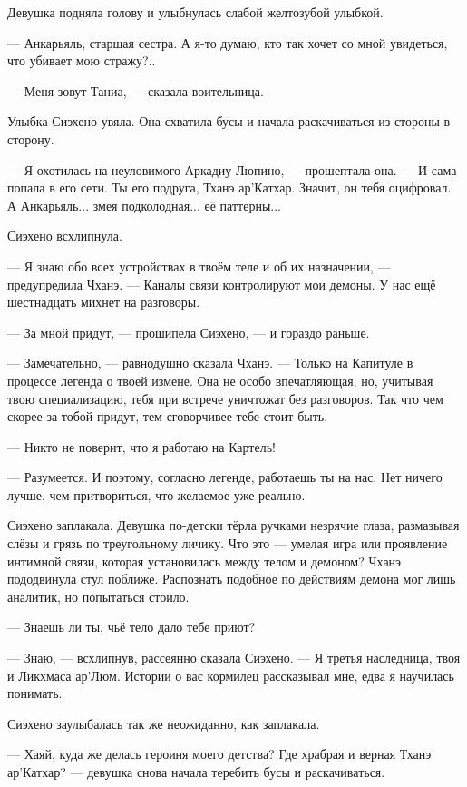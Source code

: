 Девушка подняла голову и улыбнулась слабой желтозубой улыбкой.

--- Анкарьяль, старшая сестра.
А я-то думаю, кто так хочет со мной увидеться, что убивает мою стражу?..

--- Меня зовут Таниа, --- сказала воительница.

Улыбка Сиэхено увяла.
Она схватила бусы и начала раскачиваться из стороны в сторону.

--- Я охотилась на неуловимого Аркадиу Люпино, --- прошептала она.
--- И сама попала в его сети.
Ты его подруга, Тханэ ар'Катхар.
Значит, он тебя оцифровал.
А Анкарьяль... змея подколодная... её паттерны...

Сиэхено всхлипнула.

--- Я знаю обо всех устройствах в твоём теле и об их назначении, --- предупредила Чханэ.
--- Каналы связи контролируют мои демоны.
У нас ещё шестнадцать михнет на разговоры.

--- За мной придут, --- прошипела Сиэхено, --- и гораздо раньше.

--- Замечательно, --- равнодушно сказала Чханэ.
--- Только на Капитуле в процессе легенда о твоей измене.
Она не особо впечатляющая, но, учитывая твою специализацию, тебя при встрече уничтожат без разговоров.
Так что чем скорее за тобой придут, тем сговорчивее тебе стоит быть.

--- Никто не поверит, что я работаю на Картель!

--- Разумеется.
И поэтому, согласно легенде, работаешь ты на нас.
Нет ничего лучше, чем притвориться, что желаемое уже реально.

Сиэхено заплакала.
Девушка по-детски тёрла ручками незрячие глаза, размазывая слёзы и грязь по треугольному личику.
Что это --- умелая игра или проявление интимной связи, которая установилась между телом и демоном?
Чханэ пододвинула стул поближе.
Распознать подобное по действиям демона мог лишь аналитик, но попытаться стоило.

--- Знаешь ли ты, чьё тело дало тебе приют?

--- Знаю, --- всхлипнув, рассеянно сказала Сиэхено.
--- Я третья наследница, твоя и Ликхмаса ар'Люм.
Истории о вас кормилец рассказывал мне, едва я научилась понимать.

Сиэхено заулыбалась так же неожиданно, как заплакала.

--- Хаяй, куда же делась героиня моего детства?
Где храбрая и верная Тханэ ар'Катхар? --- девушка снова начала теребить бусы и раскачиваться.

